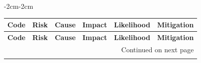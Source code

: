 \documentclass{article}
\begin{document}
\begin{adjustwidth}{-2cm}{-2cm}
\begin{longtable}{|p{1cm}|p{3.2cm}|p{4cm}|c|c|p{4cm}|}

\hline
\rowcolor{blue!25}
\textbf{Code} & \textbf{Risk} & \textbf{Cause} & \textbf{Impact} & \textbf{Likelihood} & \textbf{Mitigation} \\
\hline
\endfirsthead

\hline
\rowcolor{blue!25}
\textbf{Code} & \textbf{Risk} & \textbf{Cause} & \textbf{Impact} & \textbf{Likelihood} & \textbf{Mitigation} \\
\hline
\endhead

\hline
\multicolumn{6}{|r|}{\small Continued on next page} \\
\hline
\endfoot

\hline
\endlastfoot



\end{longtable}
\end{adjustwidth}
\end{document}
